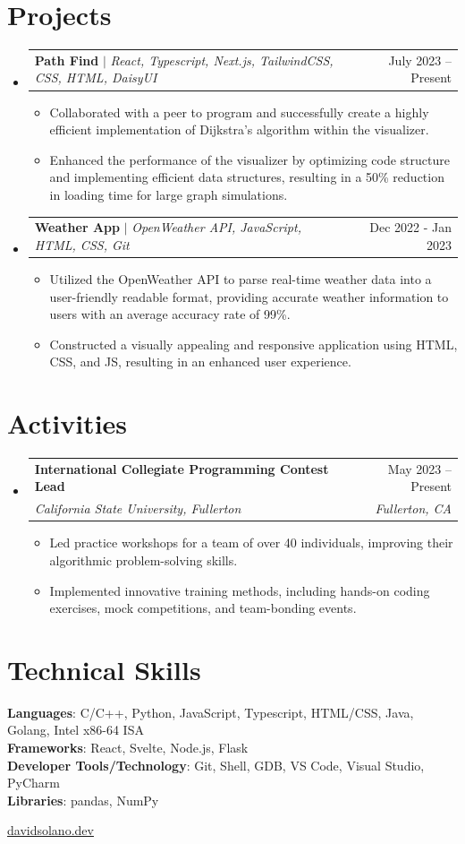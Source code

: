 \documentclass[letterpaper,11pt]{article}
\makeatletter
\newcommand{\resumeItem}[1]{
  \item\small{
    {#1 \vspace{-2pt}}
  }
}
\newcommand{\resumeSubheading}[4]{
  \vspace{-2pt}\item
    \begin{tabular*}{0.97\textwidth}[t]{l@{\extracolsep{\fill}}r}
      \textbf{#1} & #2 \\
      \textit{\small#3} & \textit{\small #4} \\
    \end{tabular*}\vspace{-7pt}
}
\newcommand{\resumeProjectHeading}[2]{
    \item
    \begin{tabular*}{0.97\textwidth}{l@{\extracolsep{\fill}}r}
      \small#1 & #2 \\
    \end{tabular*}\vspace{-7pt}
}
\newcommand{\resumeSubHeadingListStart}{\begin{itemize}[leftmargin=0.15in, label={}]}
\newcommand{\resumeSubHeadingListEnd}{\end{itemize}}
\newcommand{\resumeItemListStart}{\begin{itemize}}
\newcommand{\resumeItemListEnd}{\end{itemize}\vspace{-5pt}}
\makeatother
\begin{document}
\section{Projects}
    \resumeSubHeadingListStart
      \resumeProjectHeading
          {\textbf{Path Find} $|$ \emph{React, Typescript, Next.js, TailwindCSS, CSS, HTML, DaisyUI}}{July 2023 -- Present}
          \resumeItemListStart
            \resumeItem{Collaborated with a peer to program and successfully create a highly efficient implementation of Dijkstra's algorithm within the visualizer.}
            \resumeItem{Enhanced the performance of the visualizer by optimizing code structure and implementing efficient data structures, resulting in a 50\% reduction in loading time for large graph simulations.}
          \resumeItemListEnd
      \resumeProjectHeading
          {\textbf{Weather App} $|$ \emph{OpenWeather API, JavaScript, HTML, CSS, Git}}{Dec 2022 - Jan 2023}
          \resumeItemListStart
            \resumeItem{Utilized the OpenWeather API to parse real-time weather data into a user-friendly readable format, providing accurate weather information to users with an average accuracy rate of 99\%.}
            \resumeItem{Constructed a visually appealing and responsive application using HTML, CSS, and JS, resulting in an enhanced user experience.}
          \resumeItemListEnd
    \resumeSubHeadingListEnd



%
\section{Activities}
  \resumeSubHeadingListStart

    \resumeSubheading
      {International Collegiate Programming Contest Lead}{May 2023 -- Present}
      {California State University, Fullerton}{Fullerton, CA}
      \resumeItemListStart
        \resumeItem{Led practice workshops for a team of over 40 individuals, improving their algorithmic problem-solving skills.}
        \resumeItem{Implemented innovative training methods, including hands-on coding exercises, mock competitions, and team-bonding events.}
      \resumeItemListEnd

  \resumeSubHeadingListEnd
\section{Technical Skills}
 \begin{itemize}[leftmargin=0.15in, label={}]
    \small{\item{
     \textbf{Languages}{: C/C++, Python, JavaScript, Typescript, HTML/CSS, Java, Golang, Intel x86-64 ISA} \\
     \textbf{Frameworks}{: React, Svelte, Node.js, Flask} \\
     \textbf{Developer Tools/Technology}{: Git, Shell, GDB, VS Code, Visual Studio, PyCharm} \\
     \textbf{Libraries}{: pandas, NumPy}
    }}
 \end{itemize}

\begin{center}
  \small \vspace{10pt} \href{https://www.davidsolano.dev}{davidsolano.dev}
\end{center}
\end{document}

